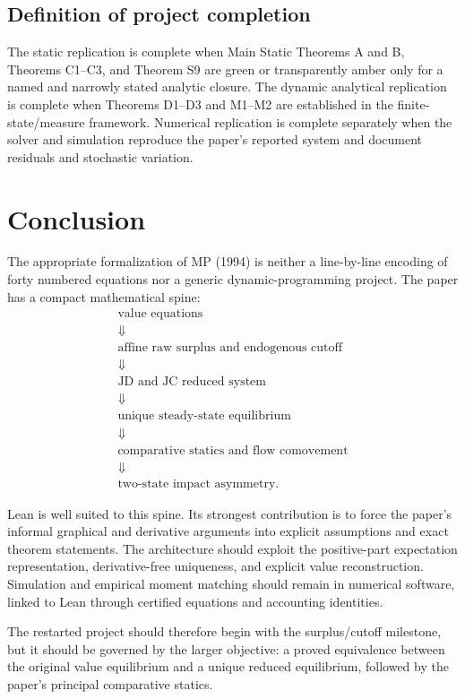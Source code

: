 \documentclass[11pt]{article}
\begin{document}
\subsection{Definition of project completion}

The static replication is complete when Main Static Theorems A and B, Theorems C1--C3, and Theorem S9 are green or transparently amber only for a named and narrowly stated analytic closure. The dynamic analytical replication is complete when Theorems D1--D3 and M1--M2 are established in the finite-state/measure framework. Numerical replication is complete separately when the solver and simulation reproduce the paper's reported system and document residuals and stochastic variation.

\section{Conclusion}

The appropriate formalization of MP (1994) is neither a line-by-line encoding of forty numbered equations nor a generic dynamic-programming project. The paper has a compact mathematical spine:
\[
\begin{array}{c}
\text{value equations}\\
\Downarrow\\
\text{affine raw surplus and endogenous cutoff}\\
\Downarrow\\
\text{JD and JC reduced system}\\
\Downarrow\\
\text{unique steady-state equilibrium}\\
\Downarrow\\
\text{comparative statics and flow comovement}\\
\Downarrow\\
\text{two-state impact asymmetry}.
\end{array}
\]

Lean is well suited to this spine. Its strongest contribution is to force the paper's informal graphical and derivative arguments into explicit assumptions and exact theorem statements. The architecture should exploit the positive-part expectation representation, derivative-free uniqueness, and explicit value reconstruction. Simulation and empirical moment matching should remain in numerical software, linked to Lean through certified equations and accounting identities.

The restarted project should therefore begin with the surplus/cutoff milestone, but it should be governed by the larger objective: a proved equivalence between the original value equilibrium and a unique reduced equilibrium, followed by the paper's principal comparative statics.
\end{document}
